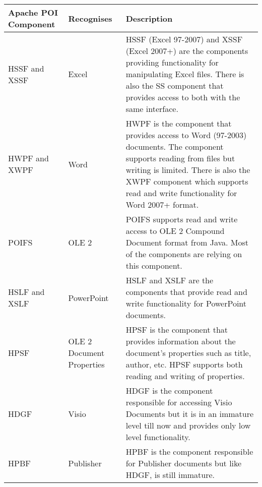 \begin{table}
    \begin{tabular}{l|p{3cm}|p{6cm}}
    \hline
    Apache POI Component & Recognises                             & Description                                                                                                                                                                                                                                   \\
    \hline
    HSSF and XSSF        & Excel                                  & HSSF (Excel 97-2007) and XSSF (Excel 2007+) are the  components providing functionality for manipulating Excel files. There is also the SS component that provides access to both with the same interface.                                    \\
    HWPF and XWPF        & Word                                   & HWPF is the component that provides access to Word (97-2003) documents. The component supports reading from files but writing is limited. There is also the XWPF component which supports read and write functionality for Word 2007+ format. \\
    POIFS                & OLE 2                                  & POIFS supports read and write access to OLE 2 Compound Document format from Java. Most of the components are relying on this component.                                                                                                       \\
    HSLF and XSLF        & PowerPoint                             & HSLF and XSLF are the components that provide read and write functionality for PowerPoint documents.                                                                                                                                          \\
    HPSF                 & OLE 2 Document Properties              & HPSF is the component that provides information about the document's properties such as title, author, etc. HPSF supports both reading and writing of properties.                                                                             \\
    HDGF                 & Visio                                  & HDGF is the component responsible for accessing Visio Documents but it is in an immature level till now and provides only low level functionality.                                                                                            \\
    HPBF                 & Publisher                              & HPBF is the component responsible for Publisher documents but like HDGF, is still immature.                                                                                                                                                   \\

\end{tabular}
\end{table}
